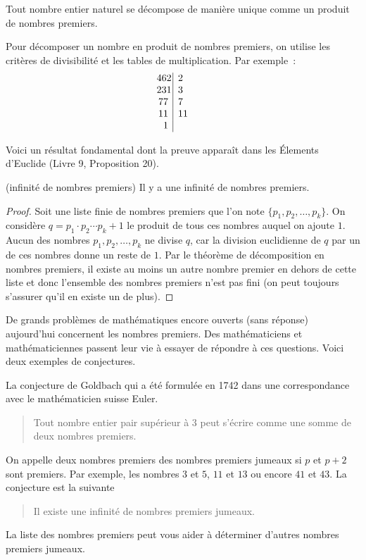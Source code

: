 \documentclass[a4paper,12pt]{report}
\begin{document}
\begin{resultat}
	Tout nombre entier naturel se décompose de manière unique comme un produit de nombres premiers.
\end{resultat}
\begin{technique}
	Pour décomposer un nombre en produit de nombres premiers, on utilise les critères de divisibilité et les tables de multiplication.
	Par exemple~: 
	\[
  \begin{array}{|l}
    \llap{462~~} 2 \\
    \llap{231~~} 3  \\
    \llap{77~~~} 7  \\
    \llap{11~~~} 11  \\
    \llap{1~~~}    \\ 
  \end{array}
\]
\end{technique}
Voici un résultat fondamental dont la preuve apparaît dans les Élements d'Euclide (Livre 9, Proposition 20).
\begin{resultat}(infinité de nombres premiers)
	Il y a une infinité de nombres premiers.
\end{resultat}
\begin{proof}
	Soit une liste finie de nombres premiers que l'on note $\{p_1,p_2,\ldots,p_k\}$.
	On considère 
	$q=p_1 \cdot p_2 \cdots p_k+1$ le produit de tous ces nombres auquel on ajoute $1$.
	Aucun des nombres $p_1,p_2,\ldots,p_k$ ne divise $q$, car la division euclidienne de $q$ par un de ces nombres donne un reste de $1$.
	Par le théorème de décomposition en nombres premiers, il existe au moins un autre nombre premier en dehors de cette liste et donc l'ensemble des nombres premiers n'est pas fini (on peut toujours s'assurer qu'il en existe un de plus).    
\end{proof}
De grands problèmes de mathématiques encore ouverts (sans réponse) aujourd'hui concernent les nombres premiers.
Des mathématiciens et mathématiciennes passent leur vie à essayer de répondre à ces questions. Voici deux exemples de conjectures. 

La conjecture de Goldbach qui a été formulée en 1742 dans une correspondance avec le mathématicien suisse Euler. 
\begin{quotation}
	Tout nombre entier pair supérieur à 3 peut s'écrire comme une somme de deux nombres premiers.
\end{quotation}

On appelle deux nombres premiers des nombres premiers jumeaux si $p$ et $p+2$ sont premiers.
Par exemple, les nombres $3$ et $5$, $11$ et $13$ ou encore $41$ et $43$. La conjecture est la suivante
\begin{quotation}
	Il existe une infinité de nombres premiers jumeaux.
\end{quotation}
La liste des nombres premiers peut vous aider à déterminer d'autres nombres premiers jumeaux. 
\end{document}
